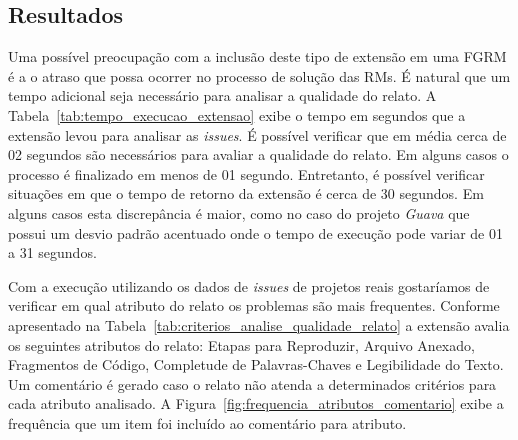 \subsection{Resultados}
\label{sub:implementacao_extensao_avaliacao_resultados}

Uma possível preocupação com a inclusão deste tipo de extensão em uma FGRM é a o
atraso que possa ocorrer no processo de solução das RMs. É natural que um tempo
adicional seja necessário para analisar a qualidade do relato. A
Tabela~\ref{tab:tempo_execucao_extensao} exibe o tempo em segundos que a
extensão levou para analisar as \textit{issues}. É possível verificar que em
média cerca de 02 segundos são necessários para avaliar a qualidade do relato.
Em alguns casos o processo é finalizado em menos de 01 segundo. Entretanto, é
possível verificar situações em que o tempo de retorno da extensão é cerca de 30
segundos. Em alguns casos esta discrepância é maior, como no caso do projeto
\textit{Guava} que possui um desvio padrão acentuado onde o tempo de execução
pode variar de 01 a 31 segundos.

\begin{table}[htpb]
\centering
{}
\caption{Tempo de execução da extensão.}
\label{tab:tempo_execucao_extensao}
\end{table}

Com a execução utilizando os dados de \textit{issues} de projetos reais
gostaríamos de verificar em qual atributo do relato os problemas são mais
frequentes. Conforme apresentado na
Tabela~\ref{tab:criterios_analise_qualidade_relato} a extensão avalia os
seguintes atributos do relato: Etapas para Reproduzir, Arquivo Anexado,
Fragmentos de Código, Completude de Palavras-Chaves e Legibilidade do Texto. Um
comentário é gerado caso o relato não atenda a determinados critérios para cada
atributo analisado. A Figura~\ref{fig:frequencia_atributos_comentario} exibe a
frequência que um item foi incluído ao comentário para atributo.

